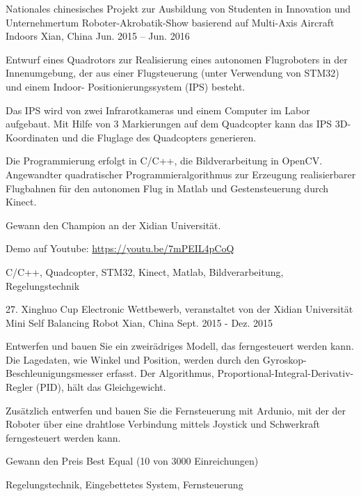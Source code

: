 \begin{cventries}
  \cventry
    {Nationales chinesisches Projekt zur Ausbildung von Studenten in Innovation und Unternehmertum} 
    {Roboter-Akrobatik-Show basierend auf Multi-Axis Aircraft Indoors}
    {Xian, China} %
    {Jun. 2015 – Jun. 2016} %
    {
      \begin{cvitems} %
        \item {Entwurf eines Quadrotors zur Realisierung eines autonomen Flugroboters in der Innenumgebung, der aus einer Flugsteuerung (unter Verwendung von STM32) und einem Indoor- Positionierungssystem (IPS) besteht.}
        \item {Das IPS wird von zwei Infrarotkameras und einem Computer im Labor aufgebaut. Mit Hilfe von 3 Markierungen auf dem Quadcopter kann das IPS 3D-Koordinaten und die Fluglage des Quadcopters generieren.}
        \item {Die Programmierung erfolgt in C/C++, die Bildverarbeitung in OpenCV. Angewandter quadratischer Programmieralgorithmus zur Erzeugung realisierbarer Flugbahnen für den autonomen Flug in Matlab und Gestensteuerung durch Kinect.}
        \item {Gewann den Champion an der Xidian Universität.}
        \item {Demo auf Youtube:  \url{https://youtu.be/7mPEIL4pCoQ}}
      \end{cvitems}
    }
	{C/C++,  Quadcopter, STM32, Kinect, Matlab, Bildverarbeitung, Regelungstechnik }	

  \cventry
    {27. Xinghuo Cup Electronic Wettbewerb, veranstaltet von der Xidian Universität} %
    {Mini Self Balancing Robot} %
    {Xian, China} %
    {Sept. 2015 - Dez. 2015} %
    {
      \begin{cvitems} %
        \item {Entwerfen und bauen Sie ein zweirädriges Modell, das ferngesteuert werden kann. Die Lagedaten, wie Winkel und Position, werden durch den Gyroskop-Beschleunigungsmesser erfasst. Der Algorithmus, Proportional-Integral-Derivativ-Regler (PID), hält das Gleichgewicht. }
       \item {Zusätzlich entwerfen und bauen Sie die Fernsteuerung mit Ardunio, mit der der Roboter über eine drahtlose Verbindung mittels Joystick und Schwerkraft ferngesteuert werden kann.}
       \item {Gewann den Preis Best Equal (10 von 3000 Einreichungen)}
      \end{cvitems}
    }{Regelungstechnik, Eingebettetes System, Fernsteuerung}

\end{cventries}
